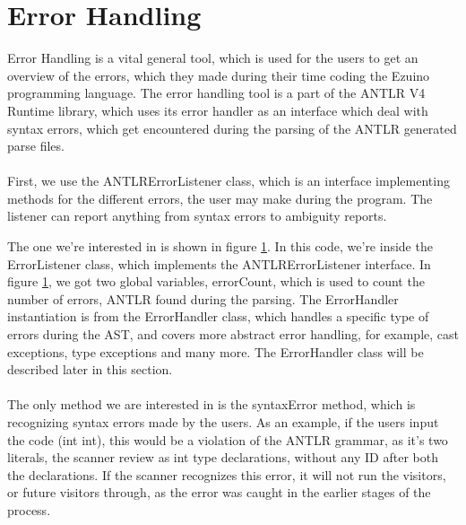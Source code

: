 \section{Error Handling}
\label{error-handling-chap}
Error Handling is a vital general tool, which is used for the users to get an overview of the errors, which they made during their time coding the Ezuino programming language. The error handling tool is a part of the ANTLR V4 Runtime library, which uses its error handler as an interface which deal with syntax errors, which get encountered during the parsing of the ANTLR generated parse files. \\
\\
First, we use the ANTLRErrorListener class, which is an interface implementing methods for the different errors, the user may make during the program. The listener can report anything from syntax errors to ambiguity reports.
\begin{figure}[H]
\centering
{}
\caption{}
\label{eh01}
\end{figure}
The one we’re interested in is shown in figure \ref{eh01}. In this code, we’re inside the ErrorListener class, which implements the ANTLRErrorListener interface.  In figure \ref{eh01}, we got two global variables, errorCount, which is used to count the number of errors, ANTLR found during the parsing. The ErrorHandler instantiation is from the ErrorHandler class, which handles a specific type of errors during the AST, and covers more abstract error handling, for example, cast exceptions, type exceptions and many more. The ErrorHandler class will be described later in this section. \\
\\
The only method we are interested in is the syntaxError method, which is recognizing syntax errors made by the users. As an example, if the users input the code (int int), this would be a violation of the ANTLR grammar, as it’s two literals, the scanner review as int type declarations, without any ID after both the declarations. If the scanner recognizes this error, it will not run the visitors, or future visitors through, as the error was caught in the earlier stages of the process.
